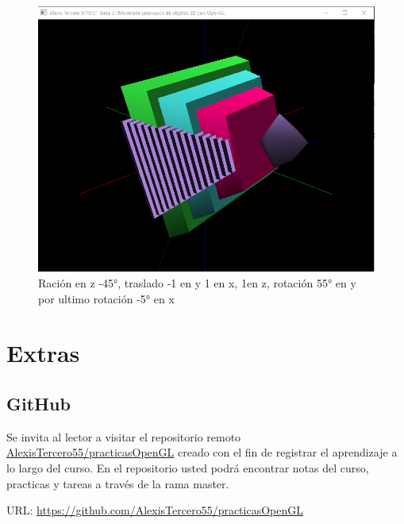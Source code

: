 \documentclass[12pt, letterpaper]{article}
\begin{document}
\begin{figure}[h!]
    \centering
    \includegraphics[scale=0.4]{2.png}
    \caption{Ración en z -45°, traslado -1 en y 1 en x, 1en z, rotación 55° en y por ultimo rotación -5° en x}
\end{figure}
\newpage
\section{Extras}



\subsection{GitHub}
Se invita al lector a visitar el repositorio remoto 
\href{https://github.com/AlexisTercero55/practicasOpenGL}{AlexisTercero55/practicasOpenGL}
creado con el fin de registrar el aprendizaje a lo largo del curso. En el repositorio usted podrá encontrar notas del curso, practicas y tareas a través de la rama master.\vspace{2ex}

URL: \url{https://github.com/AlexisTercero55/practicasOpenGL}




\end{document}
